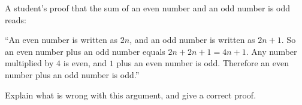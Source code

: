A student's proof that the sum of an even number and an odd number is odd reads:

``An even number is written as $2n$, and an odd number is written as $2n+1$. So an even number plus an odd number equals $2n+2n+1=4n+1$. Any number multiplied by $4$ is even, and $1$ plus an even number is odd. Therefore an even number plus an odd number is odd.''

Explain what is wrong with this argument, and give a correct proof.
